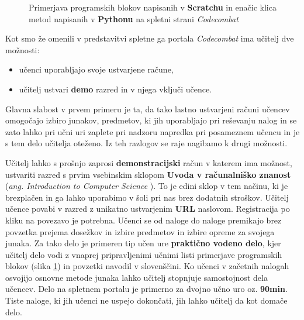 \begin{figure}[h!]
    \caption{Primerjava programskih blokov napisanih v
      \textbf{Scratchu} in enačic klica metod napisanih v
      \textbf{Pythonu} na spletni strani \emph{Codecombat}}
   \label{fig:primerjava:scrVScc}
\end{figure}

Kot smo že omenili v predstavitvi spletne ga portala \emph{Codecombat}
ima učitelj dve možnosti:

\begin{itemize}
\tightlist
\item učenci uporabljajo svoje ustvarjene račune,
\item učitelj ustvari \textbf{demo} razred in v njega vključi učence.
\end{itemize}

Glavna slabost v prvem primeru je ta, da tako lastno ustvarjeni računi
učencev omogočajo izbiro junakov, predmetov, ki jih uporabljajo pri
reševanju nalog in se zato lahko pri učni uri zaplete pri nadzoru
napredka pri posameznem učencu in je s tem delo učitelja oteženo. Iz
teh razlogov se raje nagibamo k drugi možnosti.

Učitelj lahko s prošnjo zaprosi \textbf{demonstracijski} račun v
katerem ima možnost, ustvariti razred s prvim vsebinskim sklopom
\textbf{Uvoda v računalniško znanost} (\emph{ang. Introduction to
  Computer Science }). To je edini sklop v tem načinu, ki je
brezplačen in ga lahko uporabimo v šoli pri nas brez dodatnih
stroškov. Učitelj učence povabi v razred z unikatno ustvarjenim
\textbf{URL} naslovom. Registracija po kliku na povezavo je potrebna.
Učenci se od naloge do naloge premikajo brez povzetka prejema dosežkov
in izbire predmetov in izbire opreme za svojega junaka.  Za tako delo
je primeren tip učen ure \textbf{praktično vodeno delo}, kjer učitelj
delo vodi z vnaprej pripravljenimi učnimi listi primerjave programskih
blokov (slika \ref{fig:primerjava:scrVScc}) in povzetki navodil v
slovenščini. Ko učenci v začetnih nalogah osvojijo osnovne metode
junaka lahko učitelj stopnjuje samostojnost dela učencev. Delo na
spletnem portalu je primerno za dvojno učno uro
oz. \textbf{90min}. Tiste naloge, ki jih učenci ne uspejo dokončati,
jih lahko učitelj da kot domače delo.

